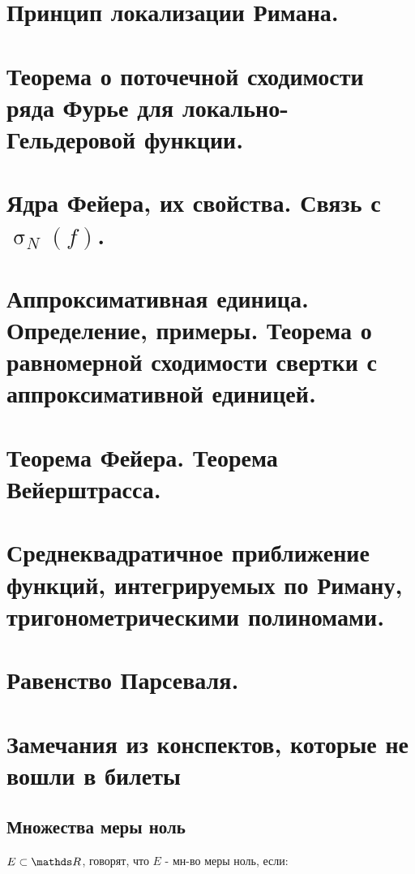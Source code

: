 \documentclass[12pt, fleqn]{article}
\begin{document}
\begin{Property}[3]
\begin{Property}[4]
\begin{Property}[2, аддитивность]
\begin{Proof}
\newpage
\section{Принцип локализации Римана.}


\newpage
\section{Теорема о поточечной сходимости ряда Фурье для локально-Гельдеровой функции.}


\newpage
\section{Ядра Фейера, их свойства. Связь с $\upsigma_N(f)$.}


\newpage
\section{Аппроксимативная единица. Определение, примеры. Теорема о равномерной сходимости свертки с аппроксимативной единицей.}


\newpage
\section{Теорема Фейера. Теорема Вейерштрасса.}


\newpage
\section{Среднеквадратичное приближение функций, интегрируемых по Риману, тригонометрическими полиномами.}


\newpage
\section{Равенство Парсеваля.}


\newpage
\section{Замечания из конспектов, которые не вошли в билеты}
\subsection{Множества меры ноль}

\begin{definition}
    $E \subset \R$, говорят, что $E$ - мн-во меры ноль, если:
    

\end{definition}
\end{Proof}
\end{Property}
\end{Property}
\end{Property}
\end{document}
